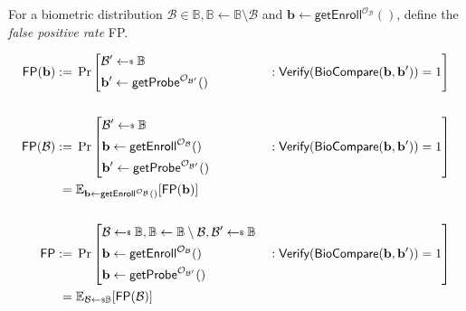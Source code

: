\begin{definition}
For a biometric distribution $\mathcal{B} \in \mathbb{B}, \mathbb{B} \gets \mathbb{B} \setminus \mathcal{B}$ and $\mathbf{b} \gets \textsf{getEnroll}^{\mathcal{O}_\mathcal{B}}()$, define the \emph{false positive rate} \textsf{FP}.

\begin{alignat*}{2}
	\textsf{FP}(\mathbf{b}) 
	:=&\; \Pr \Bigg[ 
		\begin{aligned}
			& \mathcal{B}^\prime \getsdollar \mathbb{B} \\
			& \mathbf{b}^\prime \gets \textsf{getProbe}^{\mathcal{O}_{\mathcal{B}^\prime}}()
		\end{aligned}
		&&: \textsf{Verify}(\textsf{BioCompare}(\mathbf{b}, \mathbf{b}^\prime)) = 1 \Bigg] \\
	\\
	\textsf{FP}(\mathcal{B}) 
	:=&\; \Pr \vast[ 
		\begin{aligned}
			& \mathcal{B}^\prime \getsdollar \mathbb{B} \\
			& \mathbf{b} \gets \textsf{getEnroll}^{\mathcal{O}_\mathcal{B} }() \\
			& \mathbf{b}^\prime \gets \textsf{getProbe}^{\mathcal{O}_{\mathcal{B}^\prime} }()
		\end{aligned}
		&&: \textsf{Verify}(\textsf{BioCompare}(\mathbf{b}, \mathbf{b}^\prime)) = 1 \vast] \\
	=&\; \mathbb{E}_{ \mathbf{b} \gets \textsf{getEnroll}^{\mathcal{O}_\mathcal{B}}() }[\textsf{FP}(\mathbf{b})] \\
	\\
	\textsf{FP} 
	:=&\; \Pr \vast[
		\begin{aligned}
			& \mathcal{B} \getsdollar \mathbb{B}, \mathbb{B} \gets \mathbb{B} \setminus \mathcal{B}, \mathcal{B}^\prime \getsdollar \mathbb{B} \\
			& \mathbf{b} \gets \textsf{getEnroll}^{\mathcal{O}_\mathcal{B} }() \\
			& \mathbf{b} \gets \textsf{getProbe}^{\mathcal{O}_{\mathcal{B}^\prime} }()
		\end{aligned}
		&&: \textsf{Verify}(\textsf{BioCompare}(\mathbf{b}, \mathbf{b}^\prime)) = 1 \vast] \\
	=&\; \mathbb{E}_{\mathcal{B} \getsdollar \mathbb{B}}[\textsf{FP}(\mathcal{B})]
\end{alignat*}

\end{definition}

